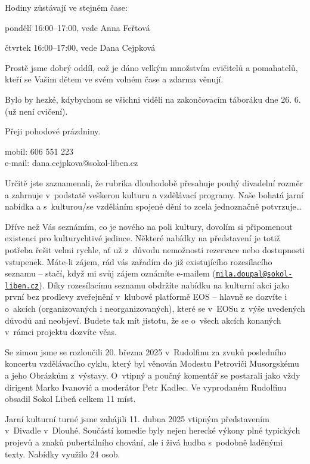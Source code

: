 \documentclass[11pt]{article}
\begin{document}
Hodiny zůstávají ve stejném čase:

pondělí 16:00--17:00, vede Anna Feřtová

čtvrtek 16:00--17:00, vede Dana Cejpková

Prostě jsme dobrý oddíl, což je dáno velkým množstvím cvičitelů a
pomahatelů, kteří se Vašim dětem ve svém volném čase a zdarma věnují.

Bylo by hezké, kdybychom se všichni viděli na zakončovacím táboráku dne
26. 6. (už není cvičení).

Přeji pohodové prázdniny.

\signature{Dana Cejpková}{mobil: 606 551 223\\e-mail: dana.cejpkova@sokol-liben.cz}

Určitě jste zaznamenali, že rubrika 
dlouhodobě přesahuje pouhý divadelní rozměr a zahrnuje v~podstatě
veškerou kulturu a vzdělávací programy. Naše bohatá jarní nabídka a
s~kulturou/se vzděláním spojené dění to zcela jednoznačně
potvrzuje\ldots{}

Dříve než Vás seznámím, co je nového na poli
kultury, dovolím si připomenout existenci  pro
kulturychtivé jedince. Některé nabídky na představení je totiž potřeba
řešit velmi rychle, ať už z~důvodu nemožnosti rezervace nebo dostupnosti
vstupenek. Máte-li zájem, rád vás zařadím do již existujícího
rozesílacího seznamu -- stačí, když mi svůj zájem oznámíte e-mailem
(\href{mailto:mila.doupal@sokol-liben.cz}{\nolinkurl{mila.doupal@sokol-liben.cz}}).
Díky rozesílacímu seznamu obdržíte nabídku na kulturní akci jako první
bez prodlevy zveřejnění v~klubové platformě EOS -- hlavně se dozvíte i
o~akcích (organizovaných i neorganizovaných), které se v~EOSu z~výše
uvedených důvodů ani neobjeví. Budete tak mít jistotu, že se o~všech
akcích konaných v~rámci projektu  dozvíte včas.

Se zimou jsme se rozloučili 20. března 2025
v~Rudolfinu za zvuků posledního koncertu vzdělávacího cyklu, který byl
věnován Modestu Petroviči Musorgskému a jeho Obrázkům z~výstavy.
O~vtipný a poučný komentář se postarali jako vždy dirigent Marko Ivanović
a moderátor Petr Kadlec. Ve vyprodaném Rudolfinu obsadil Sokol Libeň
celkem 11 míst.

Jarní kulturní turné jsme zahájili 11. dubna 2025 vtipným představením
v~Divadle v~Dlouhé. Součástí komedie  byly nejen herecké výkony plné typických projevů a znaků
pubertálního chování, ale i živá hudba s~podobně laděnými texty. Nabídky
využilo 24 osob.
\end{document}
